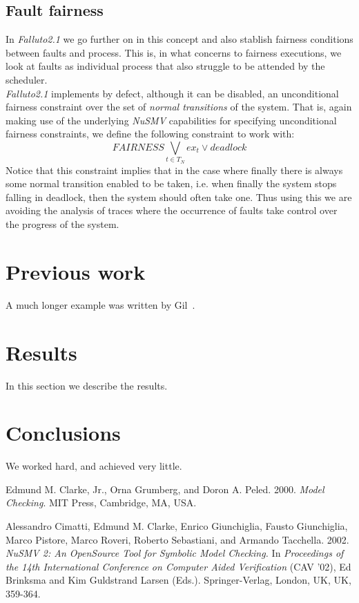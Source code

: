 \documentclass[12pt]{article}
\begin{document}
\subsection{Fault fairness}\label{fault fairness}
In \mbox{\textit{Falluto2.1}} we go further on in this concept and also 
stablish fairness conditions between faults and process. This is, in what
concerns to fairness executions, we look at faults as individual process
that also struggle to be attended by the scheduler.\\
\mbox{\textit{Falluto2.1}} implements by defect, although it can be disabled, an unconditional fairness
constraint over the set of \textit{normal transitions} of the system. That
is, again making use of the underlying \mbox{\textit{NuSMV}} capabilities for
specifying unconditional fairness constraints, we define the following
constraint to work with: $$FAIRNESS \bigvee_{t \in T_N} ex_t \vee deadlock$$
Notice that this constraint implies that in the case where finally there is always some
normal transition enabled to be taken, i.e. when finally the system stops falling in deadlock, then the system should often take one.
Thus using this we are avoiding the analysis of traces where the occurrence of faults take
control over the progress of the system. 


\section{Previous work}\label{previous work}
A much longer \LaTeXe{} example was written by Gil~\cite{Gil:02}.

\section{Results}\label{results}
In this section we describe the results.

\section{Conclusions}\label{conclusions}
We worked hard, and achieved very little.

%
%
\begin{thebibliography}{9}

    Edmund M. Clarke, Jr., Orna Grumberg, and Doron A. Peled. 2000.
    \emph{Model Checking}. MIT Press, Cambridge, MA, USA. 

    Alessandro Cimatti, Edmund M. Clarke, Enrico Giunchiglia, Fausto
    Giunchiglia, Marco Pistore, Marco Roveri, Roberto Sebastiani, and Armando
    Tacchella. 2002. \emph{NuSMV 2: An OpenSource Tool for Symbolic Model
    Checking.} In \emph{Proceedings of the 14th International Conference on
    Computer Aided Verification} (CAV '02), Ed Brinksma and Kim Guldstrand
    Larsen (Eds.). Springer-Verlag, London, UK, UK, 359-364. 

\end{thebibliography}
\end{document}
